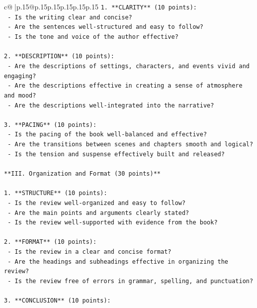 \documentclass{article}
\begin{document}
{\begin{supertabular}{c@{$\;$}|p{.15\linewidth}@{}p{.15\linewidth}p{.15\linewidth}p{.15\linewidth}p{.15\linewidth}p{.15\linewidth}}
{{{\texttt{1. **CLARITY** (10 points):} \\
\texttt{   {-} Is the writing clear and concise?} \\
\texttt{   {-} Are the sentences well{-}structured and easy to follow?} \\
\texttt{   {-} Is the tone and voice of the author effective?} \\
\\ 
\texttt{2. **DESCRIPTION** (10 points):} \\
\texttt{   {-} Are the descriptions of settings, characters, and events vivid and engaging?} \\
\texttt{   {-} Are the descriptions effective in creating a sense of atmosphere and mood?} \\
\texttt{   {-} Are the descriptions well{-}integrated into the narrative?} \\
\\ 
\texttt{3. **PACING** (10 points):} \\
\texttt{   {-} Is the pacing of the book well{-}balanced and effective?} \\
\texttt{   {-} Are the transitions between scenes and chapters smooth and logical?} \\
\texttt{   {-} Is the tension and suspense effectively built and released?} \\
\\ 
\texttt{**III. Organization and Format (30 points)**} \\
\\ 
\texttt{1. **STRUCTURE** (10 points):} \\
\texttt{   {-} Is the review well{-}organized and easy to follow?} \\
\texttt{   {-} Are the main points and arguments clearly stated?} \\
\texttt{   {-} Is the review well{-}supported with evidence from the book?} \\
\\ 
\texttt{2. **FORMAT** (10 points):} \\
\texttt{   {-} Is the review in a clear and concise format?} \\
\texttt{   {-} Are the headings and subheadings effective in organizing the review?} \\
\texttt{   {-} Is the review free of errors in grammar, spelling, and punctuation?} \\
\\ 
\texttt{3. **CONCLUSION** (10 points):} \\
}}}
\end{supertabular}}
\end{document}
